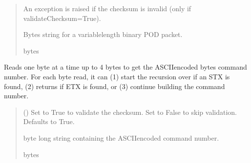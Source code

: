 \documentclass[letterpaper,10pt,english]{sphinxmanual}
\begin{document}
\begin{fulllineitems}
\begin{fulllineitems}
\begin{quote}
\begin{description}
\begin{itemize}
\end{itemize}

\sphinxAtStartPar
{} \textendash{} An exception is raised if the checksum is invalid (only if validateChecksum=True).

\sphinxAtStartPar
Bytes string for a variable\sphinxhyphen{}length binary POD packet.

\sphinxAtStartPar
bytes

\end{description}\end{quote}

\end{fulllineitems}


\begin{fulllineitems}
\label{\detokenize{BasicPodProtocol:BasicPodProtocol.POD_Basics._Read_GetCommand}}
\pysigstartsignatures
{}
\pysigstopsignatures
\sphinxAtStartPar
Reads one byte at a time up to 4 bytes to get the ASCII\sphinxhyphen{}encoded bytes command number. For each         byte read, it can (1) start the recursion over if an STX is found, (2) returns if ETX is found, or         (3) continue building the command number.
\begin{quote}\begin{description}
\sphinxAtStartPar
{} (\sphinxstyleliteralemphasis{\sphinxupquote{, }}) \textendash{} Set to True to validate the checksum. Set to False to skip                 validation. Defaults to True.

 byte long string containing the ASCII\sphinxhyphen{}encoded command number.

\sphinxAtStartPar
bytes

\end{description}\end{quote}


\end{fulllineitems}
\end{fulllineitems}
\end{document}
